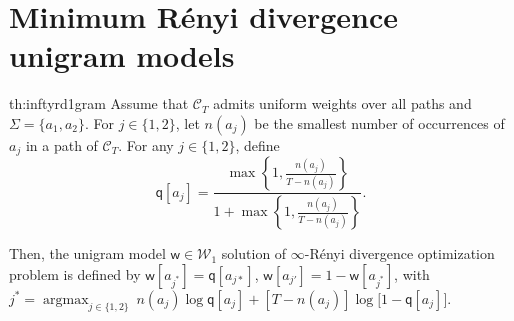 \documentclass{article}
\DeclareMathOperator*{\argmax}{argmax}
\newcommand{\sC}{\mathscr C}
\newcommand{\sfq}{{\mathsf q}}
\newcommand{\sfw}{{\mathsf w}}
\newcommand{\cW}{\mathcal W}
\newcommand{\set}[2][]{#1 \{ #2 #1 \} }
\newcommand{\ignore}[1]{}
\begin{document}
\newpage

\section{Minimum R\'enyi divergence unigram models}
\label{app:unigram}

\ignore{
If we restrict ourselves to $\sC_T$ with uniform weights and
$|\Sigma| = 2$, then we can also provide an explicit solution for
unigram automata. The solution is obtained from the paths with the
smallest number of occurrences of each symbol, which can be
straightforwardly found via a shortest-path algorithm in linear time.
}

\begin{reptheorem}{th:inftyrd1gram}
Assume that $\sC_T$ admits uniform weights over all paths and
$\Sigma = \set{a_1, a_2}$.  For $j \in \set{1, 2}$, let $n(a_j)$ be the smallest
number of occurrences of $a_j$ in a path of $\sC_T$.  For any $j \in
\set{1, 2}$, define
\begin{equation*}
\sfq[a_j] = \frac{\max\left\{1, \frac{n(a_j)}{T -
      n(a_j)}\right\}}{1+\max\left\{1, \frac{n(a_j)}{T -
      n(a_j)}\right\}}.
\end{equation*}

Then, the unigram model $\sfw \in \cW_1$ solution of
$\infty$-R\'{e}nyi divergence optimization problem is defined by
$\sfw[a_{j^*}] = \sfq[a_{j*}]$, $\sfw[a_{j'}] = 1 - \sfw[a_{j^*}]$,
with
$j^* = \argmax_{j \in \set{1, 2}} \ n(a_j) \log \sfq[a_j] + \left[T -
  n(a_j) \right] \log\big[ 1 - \sfq[a_j] \big]$.
\end{reptheorem}
\end{document}
